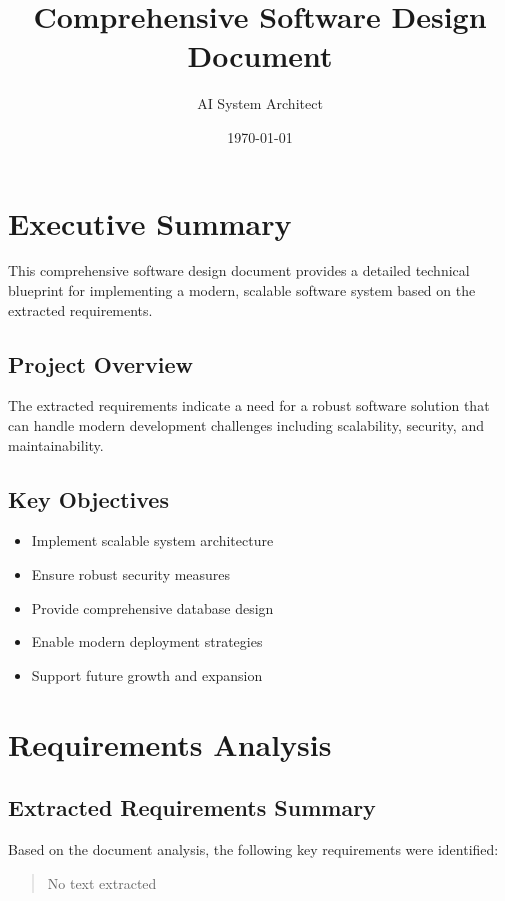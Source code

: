 \documentclass[11pt,a4paper,oneside]{article}
\title{\textbf{Comprehensive Software Design Document}}
\author{AI System Architect}
\date{\today}
\begin{document}
\maketitle
\thispagestyle{empty}
\newpage

\tableofcontents
\newpage

\section{Executive Summary}

This comprehensive software design document provides a detailed technical blueprint for implementing a modern, scalable software system based on the extracted requirements.

\subsection{Project Overview}

The extracted requirements indicate a need for a robust software solution that can handle modern development challenges including scalability, security, and maintainability.

\subsection{Key Objectives}

\begin{itemize}
\item Implement scalable system architecture
\item Ensure robust security measures
\item Provide comprehensive database design
\item Enable modern deployment strategies
\item Support future growth and expansion
\end{itemize}

\section{Requirements Analysis}

\subsection{Extracted Requirements Summary}

Based on the document analysis, the following key requirements were identified:

\begin{quote}
No text extracted
\end{quote}
\end{document}

